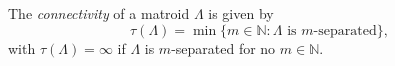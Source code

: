 The \textit{connectivity} of a matroid $\Lambda$ is given by
$$\tau(\Lambda) = \min\{m \in \mathbb{N} : \Lambda \text{ is } m\text{-separated}\},$$
with $\tau(\Lambda) = \infty$ if $\Lambda$ is $m$-separated for no $m \in \mathbb{N}$.
